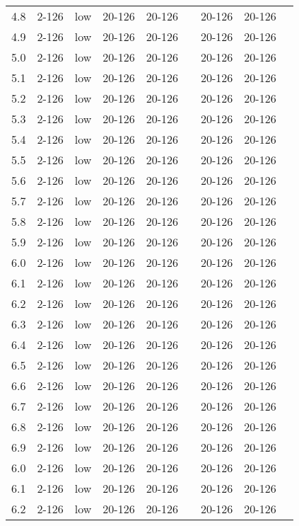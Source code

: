 \documentclass{article}
\begin{document}
\begin{center}
\begin{center}
\begin{tabular}{| c | c | c | c | c | c | c | c | c |}
      4.8 & 2-126 & low & 20-126 & 20-126 &  & 20-126 & 20-126 &\\
      4.9 & 2-126 & low & 20-126 & 20-126 &  & 20-126 & 20-126 &\\
      5.0 & 2-126 & low & 20-126 & 20-126 &  & 20-126 & 20-126 &\\
      5.1 & 2-126 & low & 20-126 & 20-126 &  & 20-126 & 20-126 &\\
      5.2 & 2-126 & low & 20-126 & 20-126 &  & 20-126 & 20-126 &\\
      5.3 & 2-126 & low & 20-126 & 20-126 &  & 20-126 & 20-126 &\\
      5.4 & 2-126 & low & 20-126 & 20-126 &  & 20-126 & 20-126 &\\
      5.5 & 2-126 & low & 20-126 & 20-126 &  & 20-126 & 20-126 &\\
      5.6 & 2-126 & low & 20-126 & 20-126 &  & 20-126 & 20-126 &\\
      5.7 & 2-126 & low & 20-126 & 20-126 &  & 20-126 & 20-126 &\\
      5.8 & 2-126 & low & 20-126 & 20-126 &  & 20-126 & 20-126 &\\
      5.9 & 2-126 & low & 20-126 & 20-126 &  & 20-126 & 20-126 &\\
      6.0 & 2-126 & low & 20-126 & 20-126 &  & 20-126 & 20-126 &\\
      6.1 & 2-126 & low & 20-126 & 20-126 &  & 20-126 & 20-126 &\\
      6.2 & 2-126 & low & 20-126 & 20-126 &  & 20-126 & 20-126 &\\
      6.3 & 2-126 & low & 20-126 & 20-126 &  & 20-126 & 20-126 &\\
      6.4 & 2-126 & low & 20-126 & 20-126 &  & 20-126 & 20-126 &\\
      6.5 & 2-126 & low & 20-126 & 20-126 &  & 20-126 & 20-126 &\\
      6.6 & 2-126 & low & 20-126 & 20-126 &  & 20-126 & 20-126 &\\
      6.7 & 2-126 & low & 20-126 & 20-126 &  & 20-126 & 20-126 &\\
      6.8 & 2-126 & low & 20-126 & 20-126 &  & 20-126 & 20-126 &\\
      6.9 & 2-126 & low & 20-126 & 20-126 &  & 20-126 & 20-126 &\\
      6.0 & 2-126 & low & 20-126 & 20-126 &  & 20-126 & 20-126 &\\
      6.1 & 2-126 & low & 20-126 & 20-126 &  & 20-126 & 20-126 &\\
      6.2 & 2-126 & low & 20-126 & 20-126 &  & 20-126 & 20-126 &\\

\end{tabular}
\end{center}
\end{center}
\end{document}
